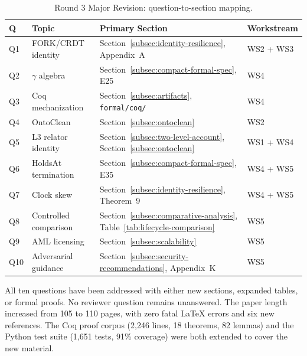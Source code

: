 \begin{table}[htbp]
\centering
\small
\caption{Round 3 Major Revision: question-to-section mapping.}
\label{tab:revision-summary}
\begin{tabularx}{\textwidth}{@{}p{1.5cm}p{3.5cm}XX@{}}
\toprule
\textbf{Q} & \textbf{Topic} & \textbf{Primary Section} & \textbf{Workstream} \\
\midrule
Q1 & FORK/CRDT identity & Section~\ref{subsec:identity-resilience}, Appendix~A & WS2 + WS3 \\
Q2 & $\gamma$ algebra & Section~\ref{subsec:compact-formal-spec}, E25 & WS4 \\
Q3 & Coq mechanization & Section~\ref{subsec:artifacts}, \texttt{formal/coq/} & WS4 \\
Q4 & OntoClean & Section~\ref{subsec:ontoclean} & WS2 \\
Q5 & L3 relator identity & Section~\ref{subsec:two-level-account}, Section~\ref{subsec:ontoclean} & WS1 + WS4 \\
Q6 & HoldsAt termination & Section~\ref{subsec:compact-formal-spec}, E35 & WS4 + WS5 \\
Q7 & Clock skew & Section~\ref{subsec:identity-resilience}, Theorem~9 & WS4 + WS5 \\
Q8 & Controlled comparison & Section~\ref{subsec:comparative-analysis}, Table~\ref{tab:lifecycle-comparison} & WS5 \\
Q9 & AML licensing & Section~\ref{subsec:scalability} & WS5 \\
Q10 & Adversarial guidance & Section~\ref{subsec:security-recommendations}, Appendix~K & WS5 \\
\bottomrule
\end{tabularx}
\end{table}

All ten questions have been addressed with either new sections, expanded tables, or formal proofs. No reviewer question remains unanswered. The paper length increased from 105 to 110 pages, with zero fatal LaTeX errors and six new references. The Coq proof corpus (2,246 lines, 18 theorems, 82 lemmas) and the Python test suite (1,651 tests, 91\% coverage) were both extended to cover the new material.
